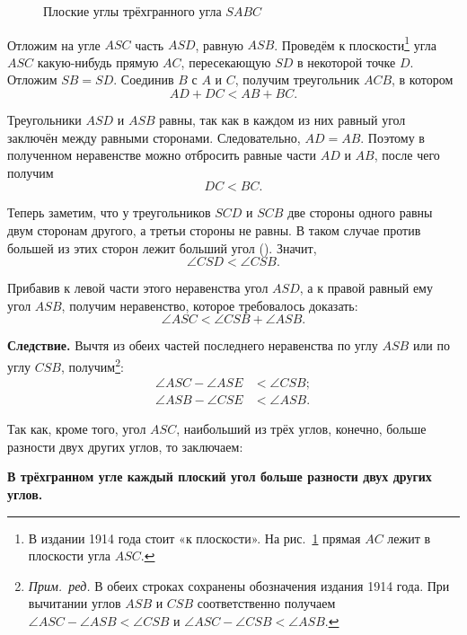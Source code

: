 \begin{figure}[htbp]
    \centering
    \renewcommand{\thefigure}{346}
    \captionsetup{name=Рис.,labelsep=period}
    
    \caption{Плоские углы трёхгранного угла \(SABC\)}\label{fig:kiselev-stereo-346}
\end{figure}

Отложим на угле \(ASC\) часть \(ASD\), равную \(ASB\). Проведём к плоскости\footnote{В издании 1914 года стоит «к плоскости». На рис.~\ref{fig:kiselev-stereo-346} прямая \(AC\) лежит в плоскости угла \(ASC\).} угла \(ASC\) какую-нибудь прямую \(AC\), пересекающую \(SD\) в некоторой точке \(D\). Отложим \(SB=SD\). Соединив \(B\) с \(A\) и \(C\), получим треугольник \(ACB\), в котором
\[
    AD+DC<AB+BC.
\]

Треугольники \(ASD\) и \(ASB\) равны, так как в каждом из них равный угол заключён между равными сторонами. Следовательно, \(AD=AB\). Поэтому в полученном неравенстве можно отбросить равные части \(AD\) и \(AB\), после чего получим
\[
    DC<BC.
\]

Теперь заметим, что у треугольников \(SCD\) и \(SCB\) две стороны одного равны двум сторонам другого, а третьи стороны не равны. В таком случае против большей из этих сторон лежит больший угол (). Значит,
\[
    \angle CSD<\angle CSB.
\]

Прибавив к левой части этого неравенства угол \(ASD\), а к правой равный ему угол \(ASB\), получим неравенство, которое требовалось доказать:
\[
    \angle ASC<\angle CSB+\angle ASB.
\]

\textbf{Следствие.} Вычтя из обеих частей последнего неравенства по углу \(ASB\) или по углу \(CSB\), получим\footnote{\emph{Прим.~ред.} В обеих строках сохранены обозначения издания 1914 года. При вычитании углов \(ASB\) и \(CSB\) соответственно получаем \(\angle ASC-\angle ASB<\angle CSB\) и \(\angle ASC-\angle CSB<\angle ASB\).}:
\[
    \begin{aligned}
        \angle ASC-\angle ASE &< \angle CSB;\\
        \angle ASB-\angle CSE &< \angle ASB.
    \end{aligned}
\]

Так как, кроме того, угол \(ASC\), наибольший из трёх углов, конечно, больше разности двух других углов, то заключаем:

\textbf{В трёхгранном угле каждый плоский угол больше разности двух других углов.}

